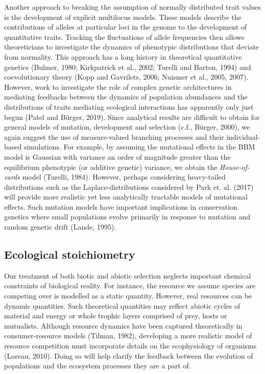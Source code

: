 \documentclass[]{elsarticle} %
\begin{document}
Another approach to breaking the assumption of normally distributed
trait values is the development of explicit multilocus models. These
models describe the contributions of alleles at particular loci in the
genome to the development of quantitative traits. Tracking the
fluctuations of allele frequencies then allows theoreticians to
investigate the dynamics of phenotypic distributions that deviate from
normality. This approach has a long history in theoretical quantitative
genetics (Bulmer, 1980; Kirkpatrick et al., 2002; Turelli and Barton,
1994) and coevolutionary theory (Kopp and Gavrilets, 2006; Nuismer et
al., 2005, 2007). However, work to investigate the role of complex
genetic architectures in mediating feedbacks between the dynamics of
population abundances and the distributions of traits mediating
ecological interactions has apparently only just begun (Patel and
Bürger, 2019). Since analytical results are difficult to obtain for
general models of mutation, development and selection (c.f., Bürger,
2000), we again suggest the use of measure-valued branching processes
and their individual-based simulations. For example, by assuming the
mutational effects in the BBM model is Gaussian with variance an order
of magnitude greater than the equilibrium phenotypic (or additive
genetic) variance, we obtain the \emph{House-of-cards} model (Turelli,
1984). However, perhaps considering heavy-tailed distributions such as
the Laplace-distributions considered by Park et. al. (2017) will provide
more realistic yet less analytically tractable models of mutational
effects. Such mutation models have important implications in
conservation genetics where small populations evolve primarily in
response to mutation and random genetic drift (Lande, 1995).

\hypertarget{ecological-stoichiometry}{%
\subsection{Ecological stoichiometry}\label{ecological-stoichiometry}}

Our treatment of both biotic and abiotic selection neglects important
chemical constraints of biological reality. For instance, the resource
we assume species are competing over is modelled as a static quantity.
However, real resources can be dynamic quantities. Such theoretical
quantities may reflect abiotic cycles of material and energy or whole
trophic layers comprised of prey, hosts or mutualists. Although resource
dynamics have been captured theoretically in consumer-resource models
(Tilman, 1982), developing a more realistic model of resource
competition must incorporate details on the ecophysiology of organisms
(Loreau, 2010). Doing so will help clarify the feedback between the
evolution of populations and the ecosystem processes they are a part of.
\end{document}
